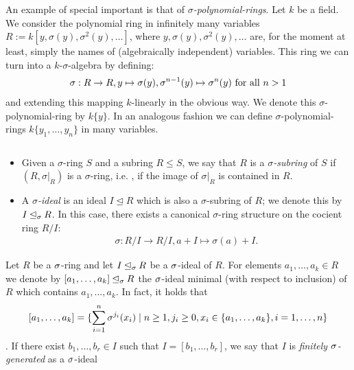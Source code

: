 \begin{ex}
An example of special important is that of $\sigma$\emph{-polynomial-rings}. 
Let $k$ be a field. We consider the polynomial ring in infinitely many variables $R:= k[y,\sigma(y),\sigma^2(y),\ldots]$,
 where $y,\sigma(y),\sigma^2(y),\ldots$ are, for the moment at least, simply the names of (algebraically independent) variables.
This ring we can turn into a $k$-$\sigma$-algebra by defining:
\begin{align*} 
\sigma:  R \rightarrow R, y \mapsto \sigma(y), \sigma^{n-1}(y) \mapsto \sigma^{n}(y) \text{ for all } n > 1 
\end{align*}
and extending this mapping $k$-linearly in the obvious way. We denote this $\sigma$-polynomial-ring by $k\{y\}$. In an analogous fashion we can define $\sigma$-polynomial-rings $k\{y_1, \ldots, y_n \}$ in many variables. 
\end{ex}

\begin{defn} $\phantom{}$
\begin{itemize}
\item Given a $\sigma$-ring $S$ and a subring $R \leq S$, we say that $R$ is a $\sigma$\emph{-subring}  of $S$ if $(R,\sigma|_{R})$ is a $\sigma$-ring,
i.e. , if the image of $\sigma|_{R}$ is contained in $R$.
\item A $\sigma$\emph{-ideal}  is an ideal $I \unlhd R$ which is also a $\sigma$-subring of $R$; we denote this by $I \unlhd_{\sigma} R$. In this case, there exists a canonical $\sigma$-ring structure on the cocient ring $R/I$:
\begin{align*} \sigma: R/I \rightarrow R/I, a + I \mapsto \sigma(a) + I. \end{align*}
\end{itemize}
\end{defn}

\begin{defn}
Let $R$ be a $\sigma$-ring and let  $I \unlhd_{\sigma} R$ be a $\sigma$-ideal of $R$. For elements $a_1, \ldots, a_k \in R$ we denote by $[a_1, \ldots, a_k] \unlhd_{\sigma} R$ the $\sigma$-ideal minimal (with respect to inclusion) of $R$ which contains $a_1,\ldots,a_k$. 
In fact, it holds that \[[a_1,\ldots,a_k] = \{ \sum_{i=1}^n \sigma^{j_i}(x_i) \mid n \geq 1, j_i \geq 0, x_i \in \{a_1,\ldots,a_k\}, i=1,\ldots,n \} \]. If there exist $b_1,\ldots,b_r \in I$ such that $I = [b_1,\ldots,b_r]$,
 we say that $I$ is \emph{finitely $\sigma$-generated} as a $\sigma$-ideal 
\end{defn}

